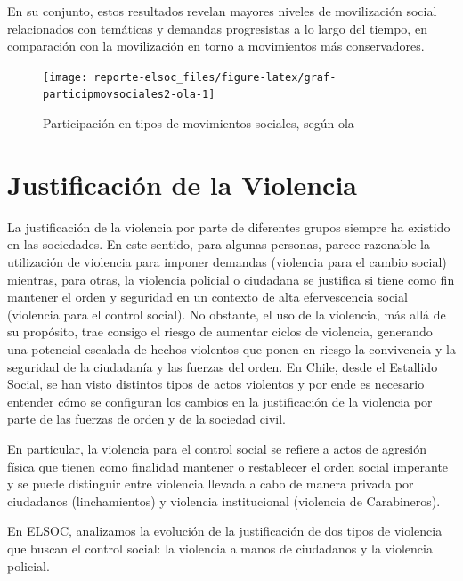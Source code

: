 \documentclass[
  12pt,
]{book}
\begin{document}
En su conjunto, estos resultados revelan mayores niveles de movilización social relacionados con temáticas y demandas progresistas a lo largo del tiempo, en comparación con la movilización en torno a movimientos más conservadores.

\begin{figure}

{\centering \texttt{[image: reporte-elsoc\_files/figure-latex/graf-participmovsociales2-ola-1]} 

}

\caption{Participación en tipos de movimientos sociales, según ola}\label{fig:graf-participmovsociales2-ola}
\end{figure}

\hypertarget{justificaciuxf3n-de-la-violencia}{%
\section{Justificación de la Violencia}\label{justificaciuxf3n-de-la-violencia}}

La justificación de la violencia por parte de diferentes grupos siempre ha existido en las sociedades. En este sentido, para algunas personas, parece razonable la utilización de violencia para imponer demandas (violencia para el cambio social) mientras, para otras, la violencia policial o ciudadana se justifica si tiene como fin mantener el orden y seguridad en un contexto de alta efervescencia social (violencia para el control social). No obstante, el uso de la violencia, más allá de su propósito, trae consigo el riesgo de aumentar ciclos de violencia, generando una potencial escalada de hechos violentos que ponen en riesgo la convivencia y la seguridad de la ciudadanía y las fuerzas del orden. En Chile, desde el Estallido Social, se han visto distintos tipos de actos violentos y por ende es necesario entender cómo se configuran los cambios en la justificación de la violencia por parte de las fuerzas de orden y de la sociedad civil.

En particular, la violencia para el control social se refiere a actos de agresión física que tienen como finalidad mantener o restablecer el orden social imperante y se puede distinguir entre violencia llevada a cabo de manera privada por ciudadanos (linchamientos) y violencia institucional (violencia de Carabineros).

En ELSOC, analizamos la evolución de la justificación de dos tipos de violencia que buscan el control social: la violencia a manos de ciudadanos y la violencia policial.
\end{document}
